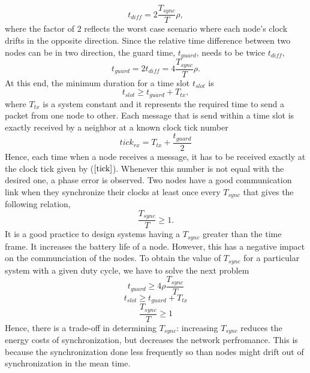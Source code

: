 \documentclass[a4paper,10pt]{report}
\begin{document}
\begin{equation}
t_{diff} = 2\frac{T_{sync}}{T}\rho ,
\end{equation}
where the factor of $2$ reflects the worst case scenario where each node's clock drifts in the opposite direction.
\newline
Since the relative time difference between two nodes can be in two direction, the guard time, $t_{guard}$, needs to be twice $t_{diff}$,
\begin{equation}
t_{guard}= 2t_{diff} = 4\frac{T_{sync}}{T}\rho.
\end{equation}
At this end, the minimum duration for a time slot $t_{slot}$ is
\begin{equation}
t_{slot} \geq t_{guard} + T_{tx},
\end{equation}
where $T_{tx}$ is a system constant and it represents the required time to send a packet from one node to other. 
\newline Each message that is send within a time slot is exactly received by a neighbor at a known clock tick number
\begin{equation}
tick_{rx} = T_{tx}+ \frac{t_{guard}}{2} \label{tick}
\end{equation}
Hence, each time when a node receives a message, it has to be received exactly at the clock tick given by ($\ref{tick}$). Whenever
this number is not equal with the desired one, a phase error is observed. 
\newline 
Two nodes have a good communication link when they synchronize their clocks at least once every $T_{sync}$ that gives the following
relation,
\begin{equation}
\frac{T_{sync}}{T}\geq 1.
\end{equation}
It is a good practice to design systems having a $T_{sync}$ greater than the time frame. It increases the battery life of a node. However,
this has a negative impact on the communciation of the nodes. 
\newline
To obtain the value of $T_{sync}$ for a particular system with a given duty cycle, we have to solve the next problem
\begin{equation}
t_{guard} \geq 4\rho \frac{T_{sync}}{T}
\end{equation}
\begin{equation}
t_{slot} \geq t_{guard} + T_{tx}
\end{equation}
\begin{equation}
\frac{T_{sync}}{T} \geq 1
\end{equation}
Hence, there is a trade-off in determining $T_{sync}$: increasing $T_{sync}$ reduces the energy costs of synchronization, but decreases the network perfromance. This is because the synchronization done less frequently so than nodes might drift out of synchronization in the mean time.
\end{document}
